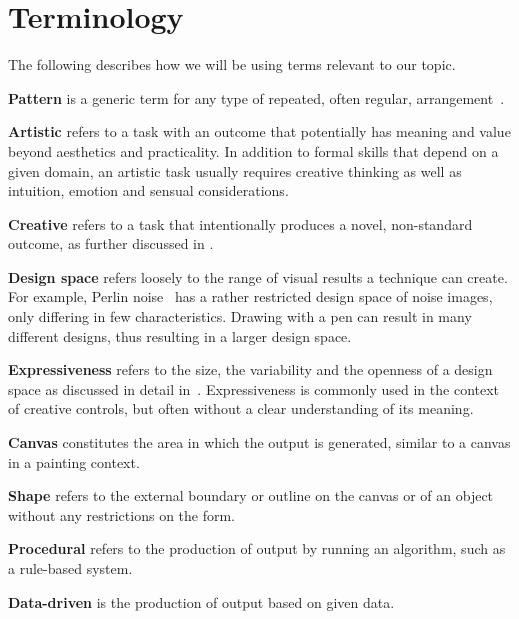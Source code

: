 
\section{Terminology}\label{terminology}
The following describes how we will be using terms relevant to our topic. 

\textbf{Pattern} is a generic term for any type of repeated, often regular, arrangement~\cite{oed_2017}.


\textbf{Artistic} refers to a task with an outcome that potentially has meaning and value beyond aesthetics and practicality. In addition to formal skills that depend on a given domain, an artistic task usually requires creative thinking as well as intuition, emotion and sensual considerations.

\textbf{Creative} refers to a task that intentionally produces a novel, non-standard outcome, as further discussed in . 

\textbf{Design space} refers loosely to the range of visual results a technique can create. For example, Perlin noise~\cite{perlin_1985_ais} has a rather restricted design space of noise images, only differing in few characteristics. Drawing with a pen can result in many different designs, thus resulting in a larger design space.

\textbf{Expressiveness} refers to the size, the variability and the openness of a design space as discussed in detail  in~. Expressiveness is commonly used in the context of creative controls, but often without a clear understanding of its meaning.

\textbf{Canvas} constitutes the area in which the output is generated, similar to a canvas in a painting context.

\textbf{Shape} refers to the external boundary or outline on the canvas or of an object without any restrictions on the form. 

\textbf{Procedural} refers to the production of output by running an algorithm, such as a rule-based system.

\textbf{Data-driven} is the production of output based on given data.



